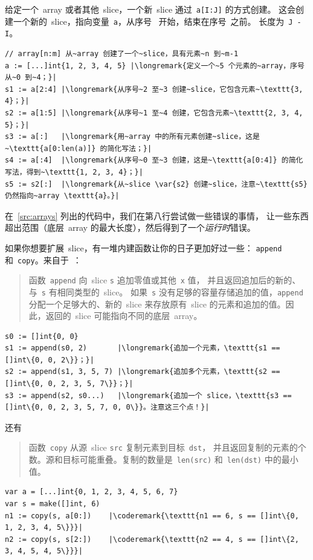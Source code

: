 给定一个~array 或者其他~slice，一个新~slice 通过~\lstinline{a[I:J]}
的方式创建。
这会创建一个新的~slice，指向变量~\lstinline{a}，从序号~ 开始，结束在序号~之前。
长度为~\lstinline{J - I}。

\begin{lstlisting}
// array[n:m] 从~array 创建了一个~slice，具有元素~n 到~m-1
a := [...]int{1, 2, 3, 4, 5} |\longremark{定义一个~5 个元素的~array，序号从~0 到~4；}|
s1 := a[2:4] |\longremark{从序号~2 至~3 创建~slice，它包含元素~\texttt{3, 4}；}|
s2 := a[1:5] |\longremark{从序号~1 至~4 创建，它包含元素~\texttt{2, 3, 4, 5}；}|
s3 := a[:]   |\longremark{用~array 中的所有元素创建~slice，这是~\texttt{a[0:len(a)]} 的简化写法；}|
s4 := a[:4]  |\longremark{从序号~0 至~3 创建，这是~\texttt{a[0:4]} 的简化写法，得到~\texttt{1, 2, 3, 4}；}|
s5 := s2[:]  |\longremark{从~slice \var{s2} 创建~slice，注意~\texttt{s5} 仍然指向~array \texttt{a}。}|
\end{lstlisting}
\showremarks

在~\ref{src:arrays} 列出的代码中，我们在第八行尝试做一些错误的事情，
让一些东西超出范围（底层~array 的最大长度），然后得到了一个\emph{运行时}错误。

如果你想要扩展~slice，有一堆内建函数让你的日子更加好过一些：
\lstinline{append} 和~\lstinline{copy}。来自于~\cite{go_spec}：
\begin{quote}
函数~\lstinline{append} 向~slice \lstinline{s} 追加零值或其他~\lstinline{x} 值，
并且返回追加后的新的、与~\lstinline{s} 有相同类型的~slice。
如果~\lstinline{s} 没有足够的容量存储追加的值，\lstinline{append} 分配一个足够大的、新的~slice
来存放原有~slice 的元素和追加的值。因此，返回的~slice 可能指向不同的底层~array。
\end{quote}
\begin{lstlisting}
s0 := []int{0, 0}
s1 := append(s0, 2)       |\longremark{追加一个元素，\texttt{s1 == []int\{0, 0, 2\}}；}|
s2 := append(s1, 3, 5, 7) |\longremark{追加多个元素，\texttt{s2 == []int\{0, 0, 2, 3, 5, 7\}}；}|
s3 := append(s2, s0...)   |\longremark{追加一个 slice，\texttt{s3 == []int\{0, 0, 2, 3, 5, 7, 0, 0\}}。注意这三个点！}|
\end{lstlisting}
\showremarks
还有
\begin{quote}
函数~\lstinline{copy} 从源~slice \lstinline{src} 复制元素到目标~\lstinline{dst}，
并且返回复制的元素的个数。源和目标可能重叠。复制的数量是~\lstinline{len(src)} 
和~\mbox{\lstinline{len(dst)}} 中的最小值。
\end{quote}
\begin{lstlisting}
var a = [...]int{0, 1, 2, 3, 4, 5, 6, 7}
var s = make([]int, 6)
n1 := copy(s, a[0:])    |\coderemark{\texttt{n1 == 6, s == []int\{0, 1, 2, 3, 4, 5\}}}|
n2 := copy(s, s[2:])    |\coderemark{\texttt{n2 == 4, s == []int\{2, 3, 4, 5, 4, 5\}}}|
\end{lstlisting}

